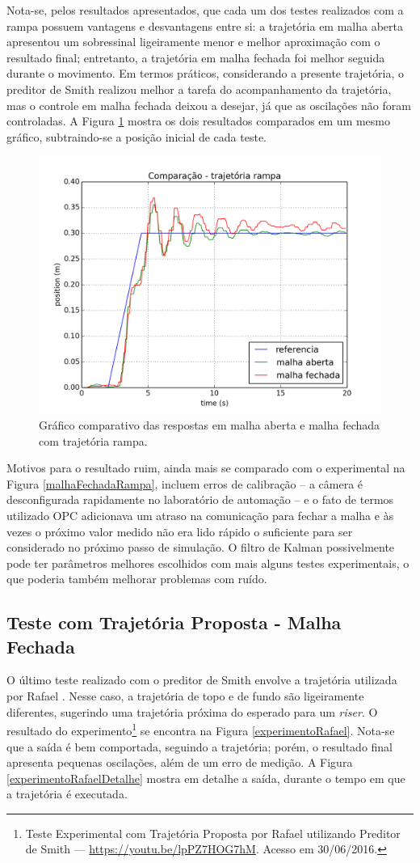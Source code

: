 Nota-se, pelos resultados apresentados, que cada um dos testes realizados com a rampa possuem vantagens e desvantagens entre si: a trajetória em malha aberta apresentou um sobressinal ligeiramente menor e melhor aproximação com o resultado final; entretanto, a trajetória em malha fechada foi melhor seguida durante o movimento. Em termos práticos, considerando a presente trajetória, o preditor de Smith realizou melhor a tarefa do acompanhamento da trajetória, mas o controle em malha fechada deixou a desejar, já que as oscilações não foram controladas. A Figura \ref{rampaComparativo} mostra os dois resultados comparados em um mesmo gráfico, subtraindo-se a posição inicial de cada teste.

\begin{figure}[!ht]
\centering
\includegraphics[width=.6\linewidth]{figs/resultados/experimento/rampa_comp}
\caption{Gráfico comparativo das respostas em malha aberta e malha fechada com trajetória rampa. \label{rampaComparativo}}
\end{figure} 

Motivos para o resultado ruim, ainda mais se comparado com o experimental na Figura \ref{malhaFechadaRampa}, incluem erros de calibração -- a câmera é desconfigurada rapidamente no laboratório de automação -- e o fato de termos utilizado OPC adicionava um atraso na comunicação para fechar a malha e às vezes o próximo valor medido não era lido rápido o suficiente para ser considerado no próximo passo de simulação. O filtro de Kalman possivelmente pode ter parâmetros melhores escolhidos com mais alguns testes experimentais, o que poderia também melhorar problemas com ruído.

\subsection{Teste com Trajetória Proposta - Malha Fechada}
O último teste realizado com o preditor de Smith envolve a trajetória utilizada por Rafael \cite{rafaelMestrado}. Nesse caso, a trajetória de topo e de fundo são ligeiramente diferentes, sugerindo uma trajetória próxima do esperado para um \textit{riser}. O resultado do experimento\footnote{Teste Experimental com Trajetória Proposta por Rafael\cite{rafaelMestrado} utilizando Preditor de Smith --- \url{https://youtu.be/lpPZ7HOG7hM}. Acesso em 30/06/2016.} se encontra na Figura \ref{experimentoRafael}. Nota-se que a saída é bem comportada, seguindo a trajetória; porém, o resultado final apresenta pequenas oscilações, além de um erro de medição. A Figura \ref{experimentoRafaelDetalhe} mostra em detalhe a saída, durante o tempo em que a trajetória é executada. 

